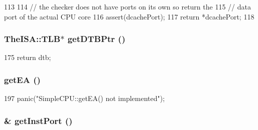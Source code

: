 \begin{DoxyCode}
113     {
114         // the checker does not have ports on its own so return the
115         // data port of the actual CPU core
116         assert(dcachePort);
117         return *dcachePort;
118     }
\end{DoxyCode}
\hypertarget{classCheckerCPU_a2fe6a07c44bc2a4d83b86bea605ba971}{
\subsubsection[{getDTBPtr}]{\setlength{\rightskip}{0pt plus 5cm}TheISA::TLB$\ast$ getDTBPtr ()}}
\label{classCheckerCPU_a2fe6a07c44bc2a4d83b86bea605ba971}



\begin{DoxyCode}
175 { return dtb; }
\end{DoxyCode}
\hypertarget{classCheckerCPU_a840be0f7fe0a7a50b37b0552fe6ca506}{
\subsubsection[{getEA}]{ getEA ()}}
\label{classCheckerCPU_a840be0f7fe0a7a50b37b0552fe6ca506}



\begin{DoxyCode}
197 { panic("SimpleCPU::getEA() not implemented\n"); }
\end{DoxyCode}
\hypertarget{classCheckerCPU_ab8ce6baf7cb0aaaf4ca346896a86fa03}{
\subsubsection[{getInstPort}]{\& getInstPort ()}}
\label{classCheckerCPU_ab8ce6baf7cb0aaaf4ca346896a86fa03}



